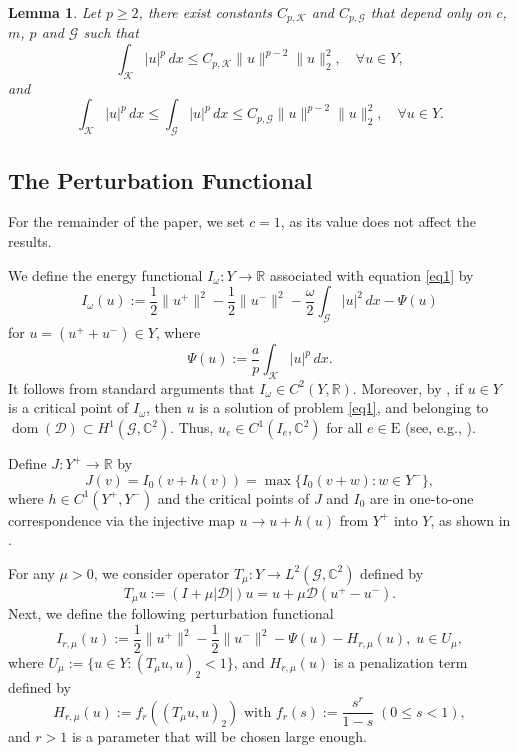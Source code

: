 \documentclass[11pt]{amsart}
\newtheorem{lemma}[theorem]{Lemma}
\newcommand{\abs}[1]{\lvert#1\rvert}
\newcommand{\norm}[1]{\lVert#1\rVert}
\newcommand{\D}{\mathcal{D}}
\newcommand{\G}{\mathcal{G}}
\newcommand{\K}{\mathcal{K}}
\numberwithin{equation}{section}
\begin{document}
\begin{lemma}\label{lemgnsg}
Let $p \geq 2$, there exist constants $C_{p,\K}$ and $C_{p,\G}$ that depend only on $c$, $m$, $p$ and $\G$ such that
\[
    \int_{\K} \abs{u}^p\,dx \leq C_{p,\K} \norm{u}^{p-2}\norm{u}_2^{2}, \quad \forall u \in Y,
\]
and
\[
 \int_{\K} \abs{u}^p\,dx \leq \int_{\G} \abs{u}^p\,dx \leq C_{p,\G} \norm{u}^{p-2}\norm{u}_2^{2}, \quad \forall u \in Y.
\]
\end{lemma}
\subsection{The Perturbation Functional}\label{subsecper} For the remainder of the paper, we set $c = 1$, as its value does not affect the results.



We define the energy functional $I_{\omega}: Y \to \mathbb{R}$ associated with equation \eqref{eq1} by
$$
I_{\omega}(u) := \frac{1}{2}\norm{u^{+}}^{2}-\frac{1}{2}\norm{u^{-}}^{2}-\frac{\omega}{2} \int_{\G}\abs{u}^{2} \,dx-\Psi(u)
$$
for $u=(u^{+}+u^{-}) \in Y$, where
$$
\Psi(u) := \frac{a}{p} \int_{\K}|u|^{p}\,dx.
$$
It follows from standard arguments that $I_{\omega} \in C^{2}(Y, \mathbb{R})$. Moreover, by \cite[Proposition 3.1]{Bo}, if $u \in Y$ is a critical point of $I_{\omega}$, then $u$ is a solution of problem \eqref{eq1}, and belonging to $\operatorname{dom}(\D) \subset H^1(\G, \mathbb{C}^2)$. Thus, $u_e \in C^1(I_e,\mathbb{C}^{2})$ for all $e \in \mathrm{E}$ (see, e.g., \cite[Remark 6 in Chapter 8]{Ha}).

Define $J: Y^{+} \rightarrow \mathbb{R}$ by
$$
J(v)=I_0(v+h(v))=\max \{I_{0}(v+w): w \in Y^{-}\},
$$
where $h \in C^1\left(Y^{+}, Y^{-}\right)$ and the critical points of $J$ and $I_0$ are in one-to-one correspondence via the injective map $u \rightarrow u+h(u)$ from $Y^{+}$ into $Y$, as shown in \cite{Ding,DingX,Ac}.

For any $\mu>0$, we consider operator $T_{\mu}: Y \rightarrow L^{2}(\G, \mathbb{C}^{2})$ defined by
$$
T_{\mu} u := (I+\mu\abs{\D}) u=u+\mu \D(u^{+}-u^{-}).
$$
Next, we define the following perturbation functional
$$
I_{r, \mu}(u) := \frac{1}{2}\norm{u^{+}}^{2}-\frac{1}{2}\norm{u^{-}}^{2}-\Psi(u)-H_{r, \mu}(u),\; u \in U_{\mu},
$$
where $U_{\mu} := \{u \in Y: (T_{\mu} u, u)_{2}<1\}$, and $H_{r, \mu}(u)$ is a penalization term defined by
$$
H_{r, \mu}(u) := f_{r}((T_{\mu} u, u)_{2}) \text { with } f_{r}(s) := \frac{s^{r}}{1-s} \; (0 \leq s<1),
$$
and $r>1$ is a parameter that will be chosen large enough.
\end{document}
